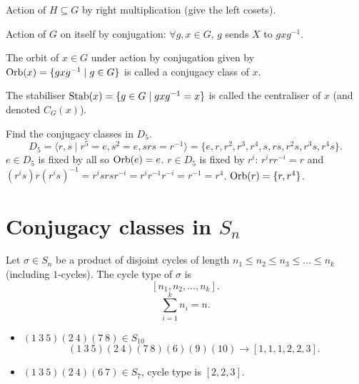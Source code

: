 \documentclass[10pt, a4paper]{article}
\begin{document}
Action of $H \subseteq G$ by right multiplication
(give the left cosets).


Action of $G$ on itself by conjugation:
$\forall g, x \in G$,
$g$ sends $X$ to $gxg ^ {-1}$.

\begin{definition}
    The orbit of $x \in G$ under action by conjugation given by $\operatorname{Orb}(x) = \{gxg ^ {-1} \mid g \in G\}$ is called a conjugacy class of $x$.

    The stabiliser $\operatorname{Stab}(x) = \{g \in G \mid gxg ^ {-1} = x\}$ is called the centraliser of $x$
    (and denoted $C_G(x)$).
\end{definition}

\begin{example}
    Find the conjugacy classes in $D_5$.
    \[
    D_5 = \langle r, s \mid r ^ 5 = e, s ^ 2 = e, srs = r ^ {-1}\rangle = \{e, r, r ^ 2, r ^ 3, r ^ 4, s, rs, r ^ 2s, r ^ 3s, r ^ 4s\}.
    \]
    $e \in D_5$ is fixed by all so $\operatorname{Orb}(e) = e$.
    $r \in D_5$ is fixed by $r ^ i$:
    $r ^ irr ^ {-i} = r$ and $(r ^ is)r(r ^ is) ^ {-1} = r ^ isrsr ^ {-i} = r ^ ir ^ {-1}r ^ {-i} = r ^ {-1} = r ^ 4$.
    $\operatorname{Orb}(r) = \{r, r ^ 4\}$.
\end{example}

\newpage

\section{Conjugacy classes in \texorpdfstring{$S_n$}{}}

\begin{definition}
    Let $\sigma \in S_n$ be a product of disjoint cycles of length $n_1 \leq n_2 \leq n_3 \leq \dotsc \leq n_k$
    (including $1$-cycles).
    The cycle type of $\sigma$ is
    \[
    [n_1, n_2, \dotsc, n_k].
    \]
    \[
    \sum_{i = 1}^{k}n_i = n.
    \]
\end{definition}

\begin{example}\phantom{}
    \begin{itemize}
        \item $(1\ 3\ 5)(2\ 4)(7\ 8) \in S_{10}$
        \[
        (1\ 3\ 5)(2\ 4)(7\ 8)(6)(9)(10) \to [1, 1, 1, 2, 2, 3].
        \]

        \item $(1\ 3\ 5)(2\ 4)(6\ 7) \in S_{7}$,
        cycle type is $[2, 2, 3]$.
    \end{itemize}
\end{example}
\end{document}
